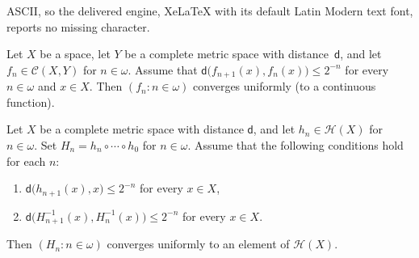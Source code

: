 \documentclass[10pt,a4paper]{amsart}
\newcommand{\CC}{\mathcal{C}}
\newcommand{\HH}{\mathcal{H}}
\newcommand{\di}{\mathsf{d}}
\begin{document}
ASCII, so the delivered engine, XeLaTeX with its default Latin Modern text font, reports no missing character.
\begin{proposition}\label{proposition_convergence}
Let $X$ be a space, let $Y$ be a complete metric space with distance~$\di$, and let $f_n\in\CC(X,Y)$ for $n\in\omega$. Assume that $\di\big(f_{n+1}(x),f_n(x)\big)\leq 2^{-n}$ for every $n\in\omega$ and $x\in X$. Then $(f_n:n\in\omega)$ converges uniformly (to a continuous function).
\end{proposition}

\begin{theorem}\label{theorem_convergence}
Let $X$ be a complete metric space with distance $\di$, and let $h_n\in\HH(X)$ for $n\in\omega$. Set $H_n=h_n\circ\cdots\circ h_0$ for $n\in\omega$. Assume that the following conditions hold for each $n$:
\begin{enumerate}
\item $\di\big(h_{n+1}(x),x\big)\leq 2^{-n}$ for every $x\in X$,
\item $\di\big(H_{n+1}^{-1}(x),H_n^{-1}(x)\big)\leq 2^{-n}$ for every $x\in X$.
\end{enumerate}
Then $(H_n:n\in\omega)$ converges uniformly to an element of $\HH(X)$.
\end{theorem}
\end{document}
